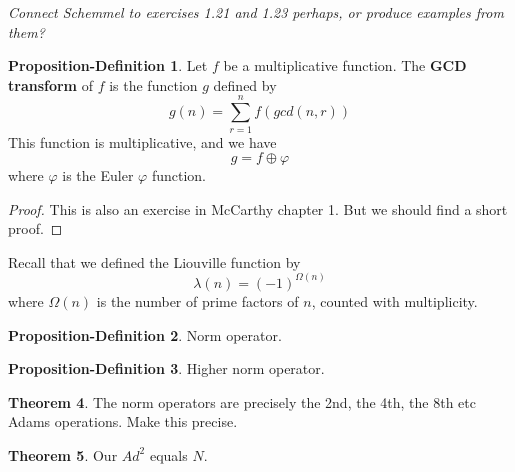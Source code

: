 \documentclass[a4paper]{article}
\theoremstyle{definition}
\newtheorem{theorem}{Theorem}[section]
\newtheorem{definition}{Definition}[section]
\newtheorem{propdef}[theorem]{Proposition-Definition}
\theoremstyle{remark}
\newcommand{\defhl}[1]{\textbf{#1}}
\begin{document}
\emph{Connect Schemmel to exercises 1.21 and 1.23 perhaps, or produce examples from them?}

\begin{propdef}
Let $f$ be a multiplicative function. The \defhl{GCD transform} of $f$ is the function $g$ defined by
$$ g(n) = \sum_{r=1}^n f(gcd(n, r))   $$
This function is multiplicative, and we have
$$ g = f \oplus \varphi    $$
where $\varphi$ is the Euler $\varphi$ function.
\end{propdef}
\begin{proof}
This is also an exercise in McCarthy chapter 1. But we should find a short proof.
\end{proof}


Recall that we defined the Liouville function by
$$  \lambda(n) = (-1)^{\Omega(n)} $$
where $\Omega(n)$ is the number of prime factors of $n$, counted with multiplicity. 
\begin{propdef}
Norm operator.
\end{propdef}


\begin{propdef}
Higher norm operator. 
\end{propdef}


\begin{theorem}
The norm operators are precisely the 2nd, the 4th, the 8th etc Adams operations. Make this precise.
\end{theorem}


\begin{theorem}
Our $Ad^2$ equals $N$.
\end{theorem}
\end{document}
